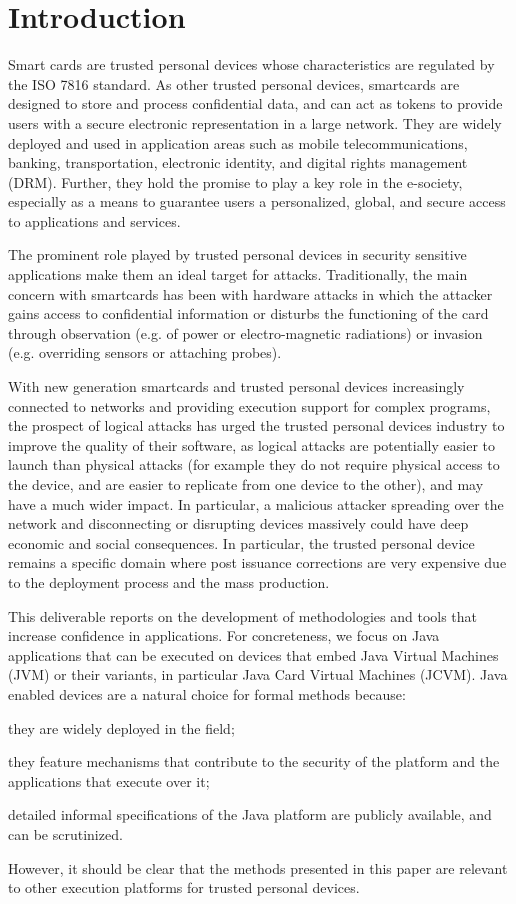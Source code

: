 \chapter{Introduction}


Smart cards are trusted personal devices whose characteristics are
regulated by the ISO 7816 standard. As other trusted personal devices,
smartcards are designed to store and process confidential data, and
can act as tokens to provide users with a secure electronic
representation in a large network. They are widely deployed and used
in application areas such as mobile telecommunications, banking,
transportation, electronic identity, and digital rights management
(DRM). Further, they hold the promise to play a key role in the
e-society, especially as a means to guarantee users a personalized,
global, and secure access to applications and services.


The prominent role played by trusted personal devices in security
sensitive applications make them an ideal target for
attacks. Traditionally, the main concern with smartcards has been with
hardware attacks in which the attacker gains access to confidential
information or disturbs the functioning of the card through
observation (e.g. of power or electro-magnetic radiations) or invasion
(e.g. overriding sensors or attaching probes).


With new generation smartcards and trusted personal devices
increasingly connected to networks and providing execution support for
complex programs, the prospect of logical attacks has urged the
trusted personal devices industry to improve the quality of their
software, as logical attacks are potentially easier to launch than
physical attacks (for example they do not require physical access to
the device, and are easier to replicate from one device to the other),
and may have a much wider impact. In particular, a malicious attacker
spreading over the network and disconnecting or disrupting devices
massively could have deep economic and social consequences. In
particular, the trusted personal device remains a specific domain
where post issuance corrections are very expensive due to the
deployment process and the mass production.

This deliverable reports on the development of methodologies and tools
that increase confidence in applications.  For concreteness, we focus 
on Java applications that can be executed on devices that embed Java
Virtual Machines (JVM) or their variants, in particular Java Card
Virtual Machines (JCVM). Java enabled devices are a natural choice for
formal methods because:
\begin{inparaenum}[i)]
\item they are widely deployed in the field;
\item they feature mechanisms that contribute to the security of the
platform and the applications that execute over it;
\item detailed informal specifications of the Java platform are publicly
available, and can be scrutinized.
\end{inparaenum}
However, it should be clear that the methods presented in this paper
are relevant to other execution platforms for trusted personal devices.


